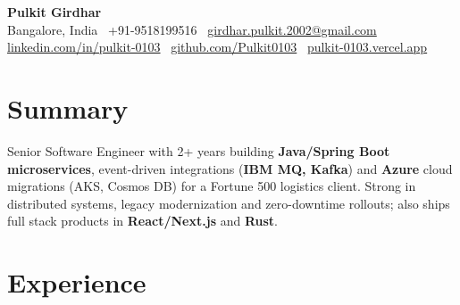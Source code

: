 \documentclass[10pt]{article}
\begin{document}
\vspace*{-30pt}
\begin{center}
    {\LARGE \textbf{Pulkit Girdhar}} \\[3pt]
    {\small
    Bangalore, India \textbar\ +91-9518199516 \textbar\
    \href{mailto:girdhar.pulkit.2002@gmail.com}{girdhar.pulkit.2002@gmail.com} \\[1pt]
    \href{https://www.linkedin.com/in/pulkit-0103/}{linkedin.com/in/pulkit-0103} \textbar\
    \href{https://github.com/Pulkit0103}{github.com/Pulkit0103} \textbar\ \href{https://pulkit-0103.vercel.app}{pulkit-0103.vercel.app}
    }
\end{center}
\vspace{-10pt}

\section*{Summary}
Senior Software Engineer with 2+ years building \textbf{Java/Spring Boot microservices}, event-driven integrations (\textbf{IBM MQ, Kafka}) and \textbf{Azure} cloud migrations (AKS, Cosmos DB) for a Fortune 500 logistics client. Strong in distributed systems, legacy modernization and zero-downtime rollouts; also ships full stack products in \textbf{React/Next.js} and \textbf{Rust}.

\section*{Experience}
\end{document}
